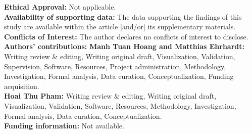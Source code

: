 \documentclass[11pt]{article}
\theoremstyle{definition}
\theoremstyle{remark}
\numberwithin{equation}{section}
\begin{document}
\medskip\noindent
\textbf{Ethical Approval:} Not applicable.\\
\textbf{Availability of supporting data:} The data supporting the findings of this study are available within the article [and/or] its supplementary materials.\\
\textbf{Conflicts of Interest:} The author declares no conflicts of interest to disclose.\\
\textbf{Authors' contributions:} \textbf{Manh Tuan Hoang and Matthias Ehrhardt:} 
Writing review \& editing, Writing original draft, Visualization, Validation, Supervision, Software, Resources, Project administration, Methodology, Investigation,
Formal analysis, Data curation, Conceptualization, Funding acquisition.\\
\textbf{Hoai Thu Pham:}
Writing review \& editing, Writing original draft, Visualization, Validation, Software, Resources, Methodology, Investigation,
Formal analysis, Data curation, Conceptualization.\\
\textbf{Funding information:} Not available.

\end{document}

